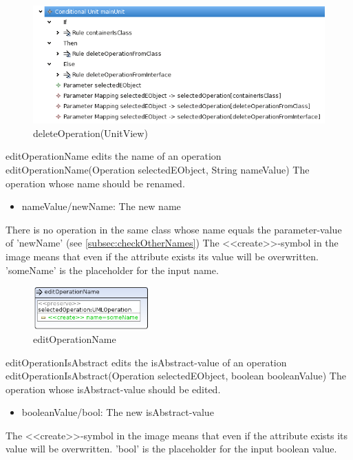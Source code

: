 \begin{figure}[H]
  \centering
  \includegraphics[width=1.0\textwidth]{pics/deleteOperation_emptyAndUnreferenced_TreeView.png}
  \caption{deleteOperation(UnitView)}
  \label{deleteOperation(UnitView)}
\end{figure}
\op
{editOperationName}
{edits the name of an operation}
{editOperationName(Operation selectedEObject, String nameValue)}
{The operation whose name should be renamed.}
{
\begin{itemize}
 \item nameValue/newName: The new name
\end{itemize}
}
{There is no operation in the same class whose name equals the parameter-value of
'newName' (see
\ref{subsec:checkOtherNames})}
{The \textless\textless create\textgreater\textgreater  -symbol in the image
means that even if the attribute exists its value will be overwritten.
'someName' is the placeholder for the input name.}
\begin{figure}[H]
  \centering
  \includegraphics[width=0.4\textwidth]{pics/editOperationName.png}
  \caption{editOperationName}
  \label{editOperationName}
\end{figure}
\op
{editOperationIsAbstract}
{edits the isAbstract-value of an operation}
{editOperationIsAbstract(Operation selectedEObject, boolean booleanValue)}
{The operation whose isAbstract-value should be edited.}
{
\begin{itemize}
 \item booleanValue/bool: The new isAbstract-value
\end{itemize}
}
{The \textless\textless create\textgreater\textgreater  -symbol in the image
means that even if the attribute exists its value will be overwritten.
'bool' is the placeholder for the input boolean value.}
